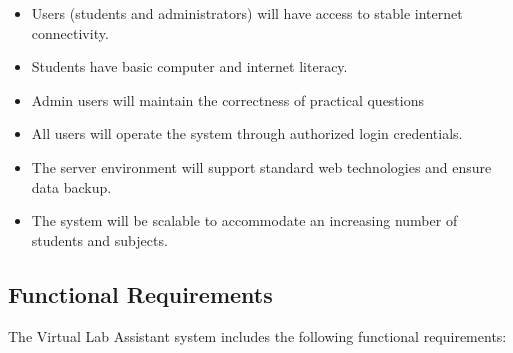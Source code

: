 \begin{itemize}

    \item	Users (students and administrators) will have access to stable internet connectivity.
    \item	Students have basic computer and internet literacy.
    \item	Admin users will maintain the correctness of practical questions 
    \item	All users will operate the system through authorized login credentials.
    \item	The server environment will support standard web technologies and ensure data backup.
    \item	The system will be scalable to accommodate an increasing number of students and subjects.

 
\end{itemize}

\subsection{ Functional Requirements}
The Virtual Lab Assistant system includes the following functional requirements:
